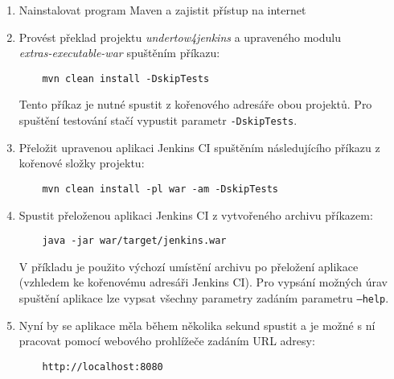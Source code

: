     \begin{enumerate}
        \item Nainstalovat program Maven a zajistit přístup na internet
        \item Provést překlad projektu \emph{undertow4jenkins} a upraveného modulu \\\emph{extras-executable-war}
            spuštěním příkazu: 

\vspace{-0.3cm}
\begin{verbatim}            
    mvn clean install -DskipTests
\end{verbatim}
\vspace{-0.3cm}

            Tento příkaz je nutné spustit z kořenového adresáře obou projektů. Pro spuštění testování
            stačí vypustit parametr \texttt{-DskipTests}.

        \item Přeložit upravenou aplikaci Jenkins CI spuštěním následujícího příkazu z kořenové
            složky projektu:

\vspace{-0.3cm}
\begin{verbatim}
    mvn clean install -pl war -am -DskipTests
\end{verbatim}
\vspace{-0.3cm}

        \item Spustit přeloženou aplikaci Jenkins CI z vytvořeného archivu příkazem:
\vspace{-0.3cm}
\begin{verbatim}
    java -jar war/target/jenkins.war
\end{verbatim}
\vspace{-0.3cm}
            
            V příkladu je použito výchozí umístění archivu po přeložení aplikace (vzhledem
            ke kořenovému adresáři Jenkins CI). Pro vypsání možných úrav
            spuštění aplikace lze vypsat všechny parametry zadáním parametru \texttt{--help}.

        \item Nyní by se aplikace měla během několika sekund spustit a je možné s ní pracovat
            pomocí webového prohlížeče zadáním URL adresy:

\vspace{-0.3cm}
\begin{verbatim}
    http://localhost:8080
\end{verbatim}
    \end{enumerate}




